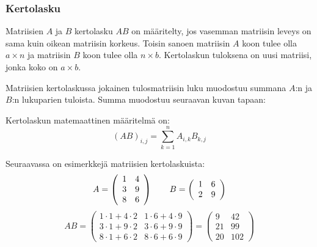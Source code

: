 \subsubsection*{Kertolasku}

Matriisien $A$ ja $B$ kertolasku $AB$ on määritelty,
jos vasemman matriisin leveys on sama kuin
oikean matriisin korkeus.
Toisin sanoen matriisin $A$ koon tulee olla $a \times n$
ja matriisin $B$ koon tulee olla $n \times b$.
Kertolaskun tuloksena on uusi matriisi,
jonka koko on $a \times b$.

Matriisien kertolaskussa jokainen tulosmatriisin
luku muodostuu summana $A$:n ja $B$:n
lukuparien tuloista.
Summa muodostuu seuraavan kuvan tapaan:
\\
\begin{center}
\end{center}

Kertolaskun matemaattinen määritelmä on:
\[
(AB)_{i,j} = \sum_{k=1}^n A_{i,k} B_{k,j}
\]

Seuraavassa on esimerkkejä matriisien kertolaskuista:
\[
A = \left( \begin{array}{cc}
1 & 4 \\
3 & 9 \\
8 & 6 \end{array} \right)
\hspace{20px}
B = 
\left( \begin{array}{cc}
1 & 6 \\
2 & 9 \end{array} \right)
\]
\[
AB =
\left( \begin{array}{ccc}
1 \cdot 1 + 4 \cdot 2 & 1 \cdot 6 + 4 \cdot 9 \\
3 \cdot 1 + 9 \cdot 2 & 3 \cdot 6 + 9 \cdot 9 \\
8 \cdot 1 + 6 \cdot 2 & 8 \cdot 6 + 6 \cdot 9 \end{array} \right)
=
\left( \begin{array}{ccc}
9 & 42 \\
21 & 99 \\
20 & 102 \end{array} \right)
\] 

